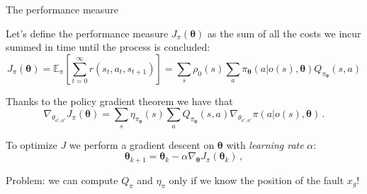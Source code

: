 \documentclass[10pt, aspectratio=169, compress, protectframetitle, handout]{beamer}
\begin{document}
\begin{frame}{The performance measure}
    
    Let's define the \alert{performance measure} $J_\pi(\boldsymbol \theta)$ as the sum of all the costs we incur summed in time until the process is concluded:
    \begin{equation}
            J_\pi (\boldsymbol \theta)
            = \mathbb E_\pi \left[ \sum_{t=0}^\infty r(s_t, a_t, s_{t+1}) \right]
            = \sum_s \rho_0(s) \sum_a \pi_{\boldsymbol \theta} (a|o(s), \boldsymbol \theta) Q_{\pi_{\boldsymbol \theta}} (s,a)
    \end{equation}
    
    Thanks to the \alert{policy gradient theorem} we have that
    \begin{equation}
        \nabla_{\theta_{o',a'}} J_\pi (\boldsymbol \theta) = \sum_s \eta_{\pi_{\boldsymbol \theta}}(s) \sum_a Q_{\pi_{\boldsymbol \theta}}(s,a) \nabla_{\theta_{o',a'}} \pi(a|o(s), \boldsymbol \theta) \, .
    \end{equation}
    
    To optimize $J$ we perform a gradient descent on $\boldsymbol \theta$ with \emph{learning rate} $\alpha$:
    \begin{equation}
        \boldsymbol \theta_{k+1} = \boldsymbol \theta_k - \alpha \nabla_{\boldsymbol \theta} J_\pi(\boldsymbol \theta_k) \, ,
        \label{eq:grad-descent}
    \end{equation}
    
    
\end{frame}

\begin{frame}[standout]
    
    \alert{Problem:} we can compute $Q_\pi$ and $\eta_\pi$ only if we know the position of the fault $x_g$!
    
\end{frame}
\end{document}
